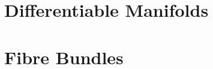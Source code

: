 \documentclass[../../../deep-dive]{subfiles}
\begin{document}
\chapter{Differentiable Manifolds}



\chapter{Fibre Bundles}




% 
\end{document}
